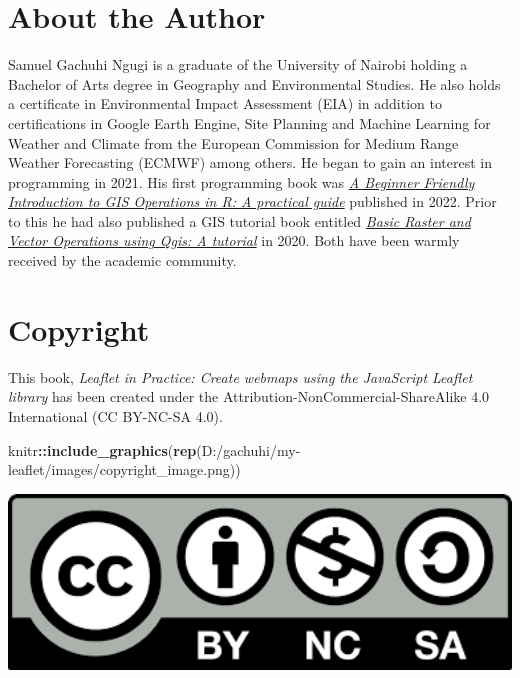 \documentclass[
]{book}
\newenvironment{Shaded}{\begin{snugshade}}{\end{snugshade}}
\newcommand{\FunctionTok}[1]{\textcolor[rgb]{0.13,0.29,0.53}{\textbf{#1}}}
\newcommand{\NormalTok}[1]{#1}
\newcommand{\SpecialCharTok}[1]{\textcolor[rgb]{0.81,0.36,0.00}{\textbf{#1}}}
\newcommand{\StringTok}[1]{\textcolor[rgb]{0.31,0.60,0.02}{#1}}
\begin{document}
\hypertarget{about-the-author}{%
\section*{About the Author}\label{about-the-author}}

Samuel Gachuhi Ngugi is a graduate of the University of Nairobi holding a Bachelor of Arts degree in Geography and Environmental Studies. He also holds a certificate in Environmental Impact Assessment (EIA) in addition to certifications in Google Earth Engine, Site Planning and Machine Learning for Weather and Climate from the European Commission for Medium Range Weather Forecasting (ECMWF) among others. He began to gain an interest in programming in 2021. His first programming book was \href{https://www.researchgate.net/publication/365301997_A_Beginner_Friendly_Introduction_to_GIS_Operations_in_R_A_practical_guide}{\emph{A Beginner Friendly Introduction to GIS Operations in R: A practical guide}} published in 2022. Prior to this he had also published a GIS tutorial book entitled \href{https://www.researchgate.net/publication/341343109_BASIC_RASTER_AND_VECTOR_OPERATIONS_USING_QGIS_A_TUTORIAL}{\emph{Basic Raster and Vector Operations using Qgis: A tutorial}} in 2020. Both have been warmly received by the academic community.

\hypertarget{copyright}{%
\section*{Copyright}\label{copyright}}

This book, \emph{Leaflet in Practice: Create webmaps using the JavaScript Leaflet library} has been created under the Attribution-NonCommercial-ShareAlike 4.0 International (CC BY-NC-SA 4.0).

\begin{Shaded}
\begin{Highlighting}[]
\NormalTok{knitr}\SpecialCharTok{::}\FunctionTok{include\_graphics}\NormalTok{(}\FunctionTok{rep}\NormalTok{(}\StringTok{\textquotesingle{}D:/gachuhi/my{-}leaflet/images/copyright\_image.png\textquotesingle{}}\NormalTok{))}
\end{Highlighting}
\end{Shaded}

\includegraphics[width=5.28in]{../images/copyright_image}
\end{document}

